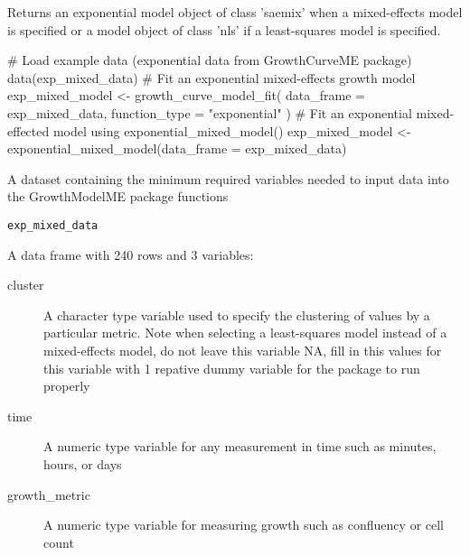 \documentclass[a4paper]{book}
\begin{document}
%
\begin{Value}
Returns an exponential model object of class 'saemix' when a
mixed-effects model is specified or a model object of class 'nls' if a
least-squares model is specified.
\end{Value}
%
\begin{SeeAlso}
\end{SeeAlso}
%
\begin{Examples}
\begin{ExampleCode}
# Load example data (exponential data from GrowthCurveME package)
data(exp_mixed_data)
# Fit an exponential mixed-effects growth model
exp_mixed_model <- growth_curve_model_fit(
  data_frame = exp_mixed_data,
  function_type = "exponential"
)
# Fit an exponential mixed-effected model using exponential_mixed_model()
exp_mixed_model <- exponential_mixed_model(data_frame = exp_mixed_data)
\end{ExampleCode}
\end{Examples}
%
\begin{Description}
A dataset containing the minimum required variables needed to input data
into the GrowthModelME package functions
\end{Description}
%
\begin{Usage}
\begin{verbatim}
exp_mixed_data
\end{verbatim}
\end{Usage}
%
\begin{Format}
A data frame with 240 rows and 3 variables:
\begin{description}

\item[cluster] A character type variable used to specify the clustering
of values by a particular metric. Note when selecting a least-squares
model instead of a mixed-effects model, do not leave this variable NA,
fill in this values for this variable with 1 repative dummy variable for
the package to run properly
\item[time] A numeric type variable for any measurement in time such as
minutes, hours, or days
\item[growth\_metric] A numeric type variable for measuring growth such as
confluency or cell count

\end{description}

\end{Format}
\end{document}
